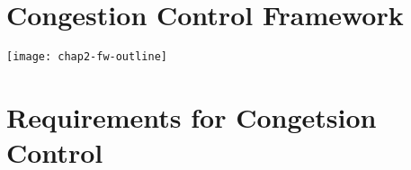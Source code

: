 

\section{Congestion Control Framework}
\label{rg.ch.cc.fw}


\texttt{[image: chap2-fw-outline]}

\section{Requirements for Congetsion Control}
\label{fw.cc.eval}